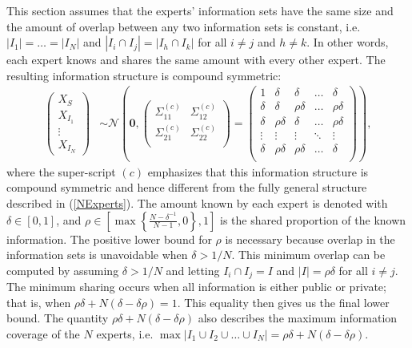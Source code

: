 \documentclass[11pt,twoside]{article}
\theoremstyle{definition}
\theoremstyle{definition}
\begin{document}
This section assumes that the experts' information sets have the same size and the amount of overlap between any two information sets is constant, i.e.  $|I_{1}| =  \dots = |I_{N}|$ and $|I_{i} \cap I_{j}| = |I_{h} \cap I_{k}|$ for all $i \neq j$ and $h \neq k$. In other words, each expert knows and shares the same amount with every other expert. The resulting information structure is compound symmetric:
\begin{align*}
\left(\begin{matrix} X_{S} \\ X_{I_1}\\ \vdots \\ X_{I_N} \end{matrix}\right) &\sim \mathcal{N}\left( 
 \boldsymbol{0}, \left(\begin{matrix} 
\Sigma_{11}^{(c)} & \Sigma_{12}^{(c)}\\
\Sigma_{21}^{(c)} & \Sigma_{22}^{(c)}\\
 \end{matrix}\right) 
 =
 \left(\begin{array}{c|cccc}
1 & \delta & \delta & \dots & \delta  \\ \hline
\delta & \delta &\rho\delta & \dots & \rho\delta   \\ 
\delta & \rho\delta & \delta & \dots & \rho\delta  \\ 
\vdots & \vdots & \vdots & \ddots & \vdots  \\ 
\delta & \rho\delta & \rho\delta & \dots & \delta\\ 
 \end{array}\right)\right),
\end{align*}
where the super-script $(c)$ emphasizes that this information structure is compound symmetric and hence different from the fully general structure described in (\ref{NExperts}). The amount known by each expert is denoted with $\delta \in [0,1]$, and $\rho \in \left[  \max \left\{ \frac{N-\delta^{-1}}{N-1}, 0\right\}, 1 \right]$ is the shared proportion of the known information. The positive lower bound for $\rho$ is necessary because overlap in the information sets is unavoidable when $\delta > 1/N$. This minimum overlap can be computed by assuming $\delta > 1/N$ and letting $I_{i} \cap I_j = I$ and $|I| =  \rho \delta$ for all $i \neq j$. The minimum sharing occurs when all information is either public or private; that is, when $\rho\delta + N(\delta - \delta\rho) = 1$. This equality then gives us the final lower bound. The quantity  $\rho\delta + N(\delta - \delta\rho)$ also describes the maximum information coverage of the $N$ experts, i.e. $\max | I_1 \cup I_2 \cup \dots \cup I_N| = \rho\delta + N(\delta - \delta\rho)$. 
\end{document}
